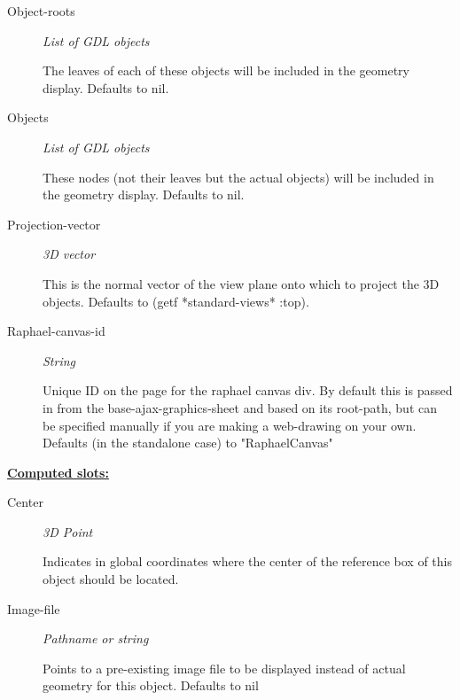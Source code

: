 \documentclass [11pt]{book}
\begin{document}
\begin{itemize}
\begin{description}
\item [Object-roots]
\emph{List of GDL objects}

 The leaves of each of these objects will be included in the geometry display. Defaults to nil.




\item [Objects]
\emph{List of GDL objects}

 These nodes (not their leaves but the actual objects) will be included in the geometry display. Defaults to nil.




\item [Projection-vector]
\emph{3D vector}

 This is the normal vector of the view plane onto which to project the 3D objects. Defaults to (getf *standard-views* :top).




\item [Raphael-canvas-id]
\emph{String}

 Unique ID on the page for the raphael canvas div. By default this is passed in
from the base-ajax-graphics-sheet and based on its root-path, but can be specified manually
if you are making a web-drawing on your own. Defaults (in the standalone case) to "RaphaelCanvas"




\end{description}






\textbf{
\underline{Computed slots:}}

\begin{description}

\item [Center]
\emph{3D Point}

 Indicates in global coordinates where the center of the reference
box of this object should be located.




\item [Image-file]
\emph{Pathname or string}

 Points to a pre-existing image file to be displayed instead of actual geometry for this object. Defaults to nil





\end{description}
\end{itemize}
\end{document}
